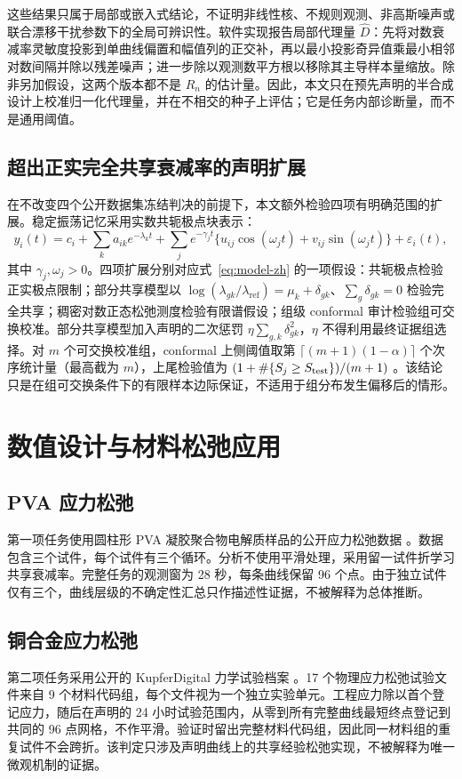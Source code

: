 \documentclass[UTF8,11pt]{ctexart}
\begin{document}
这些结果只属于局部或嵌入式结论，不证明非线性核、不规则观测、非高斯噪声或联合漂移干扰参数下的全局可辨识性。软件实现报告局部代理量 $\widehat D$：先将对数衰减率灵敏度投影到单曲线偏置和幅值列的正交补，再以最小投影奇异值乘最小相邻对数间隔并除以残差噪声；进一步除以观测数平方根以移除其主导样本量缩放。除非另加假设，这两个版本都不是 $R_n$ 的估计量。因此，本文只在预先声明的半合成设计上校准归一化代理量，并在不相交的种子上评估；它是任务内部诊断量，而不是通用阈值。

\subsection{超出正实完全共享衰减率的声明扩展}
在不改变四个公开数据集冻结判决的前提下，本文额外检验四项有明确范围的扩展。稳定振荡记忆采用实数共轭极点块表示：
\begin{equation}
y_i(t)=c_i+\sum_k a_{ik}e^{-\lambda_k t}+\sum_j e^{-\gamma_j t}\{u_{ij}\cos(\omega_jt)+v_{ij}\sin(\omega_jt)\}+\varepsilon_i(t),
\label{eq:oscillatory-extension-zh}
\end{equation}
其中 $\gamma_j,\omega_j>0$。四项扩展分别对应式~\eqref{eq:model-zh} 的一项假设：共轭极点检验正实极点限制；部分共享模型以 $\log(\lambda_{gk}/\lambda_{\mathrm{ref}})=\mu_k+\delta_{gk}$、$\sum_g\delta_{gk}=0$ 检验完全共享；稠密对数正态松弛测度检验有限谱假设；组级 conformal 审计检验组可交换校准。部分共享模型加入声明的二次惩罚 $\eta\sum_{g,k}\delta_{gk}^2$，$\eta$ 不得利用最终证据组选择。对 $m$ 个可交换校准组，conformal 上侧阈值取第 $\lceil(m+1)(1-\alpha)\rceil$ 个次序统计量（最高截为 $m$），上尾检验值为 $(1+\#\{S_j\ge S_{\rm test}\})/(m+1)$ \cite{shafer2008conformal}。该结论只是在组可交换条件下的有限样本边际保证，不适用于组分布发生偏移后的情形。
\section{数值设计与材料松弛应用}
\subsection{PVA 应力松弛}
第一项任务使用圆柱形 PVA 凝胶聚合物电解质样品的公开应力松弛数据 \cite{schelkow2026pva}。数据包含三个试件，每个试件有三个循环。分析不使用平滑处理，采用留一试件折学习共享衰减率。完整任务的观测窗为 28 秒，每条曲线保留 96 个点。由于独立试件仅有三个，曲线层级的不确定性汇总只作描述性证据，不被解释为总体推断。

\subsection{铜合金应力松弛}
第二项任务采用公开的 KupferDigital 力学试验档案 \cite{kupferdigital2024relaxation}。17 个物理应力松弛试验文件来自 9 个材料代码组，每个文件视为一个独立实验单元。工程应力除以首个登记应力，随后在声明的 24 小时试验范围内，从零到所有完整曲线最短终点登记到共同的 96 点网格，不作平滑。验证时留出完整材料代码组，因此同一材料组的重复试件不会跨折。该判定只涉及声明曲线上的共享经验松弛实现，不被解释为唯一微观机制的证据。
\end{document}
